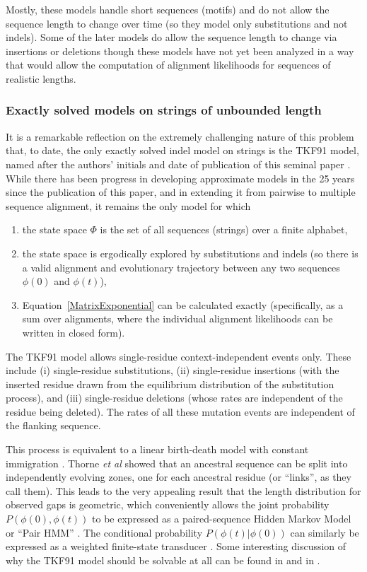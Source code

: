 \documentclass{bmcart}
\newcommand{\eqref}[1]{Equation~\ref{#1}}
\newcommand{\statespace}{\Phi}
\newcommand{\state}{\phi}
\begin{document}
Mostly, these models handle short sequences (motifs) and do not allow the sequence length to change over time
(so they model only substitutions and not indels).
Some of the later models do allow the sequence length to change via insertions or deletions
\cite{pmid26135206} though these models have not yet been analyzed in a way that would allow the
computation of alignment likelihoods for sequences of realistic lengths.
\color{black}

\subsubsection*{Exactly solved models on strings of unbounded length}

It is a remarkable reflection on the extremely challenging nature of this problem
that, to date, the only exactly solved indel model on strings
is the TKF91 model, named after the authors' initials and date of publication
of this seminal paper \cite{ThorneEtal91}.
While there has been progress in developing approximate models in the 25 years since the publication of this paper,
and in extending it from pairwise to multiple sequence alignment,
it remains the only model for which
\begin{enumerate}
\item the state space $\statespace$ is the set of all sequences (strings) over a finite alphabet,
\item the state space is ergodically explored by substitutions and indels
(so there is a valid alignment and evolutionary trajectory between any two sequences $\state(0)$ and $\state(t)$),
\item \eqref{MatrixExponential} can be calculated exactly
 (specifically, as a sum over alignments,
  where the individual alignment likelihoods can be written in closed form).
\end{enumerate}

The TKF91 model allows single-residue context-independent events only.
These include (i) single-residue substitutions,
(ii) single-residue insertions (with the inserted residue drawn from the equilibrium distribution
of the substitution process), and
(iii) single-residue deletions (whose rates are independent of the residue being deleted).
The rates of all these mutation events are independent of the flanking sequence.

This process is equivalent to a linear birth-death model with constant immigration
\cite{Feller71}.
Thorne {\em et al} showed that 
an ancestral sequence can be split into independently evolving zones, one for each ancestral residue
(or ``links'', as they call them).
This leads to the very appealing result that the length distribution for observed gaps is geometric,
which conveniently allows the joint probability $P(\state(0),\state(t))$ to be expressed
as a paired-sequence Hidden Markov Model or ``Pair HMM'' \cite{HolmesBruno2001}.
The conditional probability $P(\state(t)|\state(0))$
can similarly be expressed as a weighted finite-state transducer \cite{Holmes2003,WestessonEtAl2012,BouchardCote2013}.
\color{red}
Some interesting discussion of why the TKF91 model should be solvable at all can be found in
\cite{Metzler2003} and in \cite{pmid22644340}.
\color{black}
\end{document}
